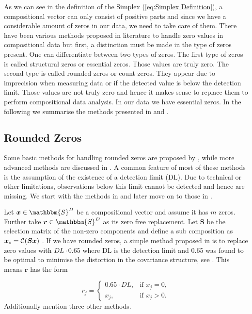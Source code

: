 As we can see in the definition of the Simplex (\ref{eq:Simplex Definition}), a compositional vector can only consist of positive parts and since we have a considerable amount of zeros in our data, we need to take care of them. There have been various methods proposed in literature to handle zero values in compositional data but first, a distinction must be made in the type of zeros present. One can differentiate between two types of zeros. The first type of zeros is called structural zeros or essential zeros. Those values are truly zero. The second type is called rounded zeros or count zeros. They appear due to imprecision when measuring data or if the detected value is below the detection limit. Those values are not truly zero and hence it makes sense to replace them to perform compositional data analysis. In our data we have essential zeros. In the following we summarise the methods presented in \textcite{Lubbe:2021} and \textcite{Josep:2003}. 

\subsection{Rounded Zeros}
\label{sec:Rounded Zeros}
Some basic methods for handling rounded zeros are proposed by \textcite{Josep:2003}, while more advanced methods are discussed in \textcite{Palarea-Albaladejo:2015}. A common feature of most of these methods is the assumption of the existence of a detection limit (DL). Due to technical or other limitations, observations below this limit cannot be detected and hence are missing. We start with the methods in \textcite{Josep:2003} and later move on to those in \textcite{Palarea-Albaladejo:2015}.

Let $\bm{x} \in \mathbbm{S}^D$ be a compositional vector and assume it has $m$ zeros. Further take $\bm{r} \in \mathbbm{S}^D$ as its zero free replacement. Let $\bm{S}$ be the selection matrix of the non-zero components and define a sub composition as $\bm{x}_s=\mathcal{C}(\bm{Sx})$ . If we have rounded zeros, a simple method proposed in \textcite{Josep:2003} is to replace zero values with $DL \cdot 0.65$ where DL is the detection limit and 0.65 was found to be optimal to minimise the distortion in the covariance structure, see \textcite{Lubbe:2021}. This means $\bm{r}$ has the form

\begin{equation}
r_j = 
\begin{cases}
0.65\cdot DL, & \text{if } x_j=0, \\
x_j, & \text{if } x_j>0.
\end{cases}
\label{eq:DL065}
\end{equation}
%
Additionally \textcite{Josep:2003} mention three other methods. 

